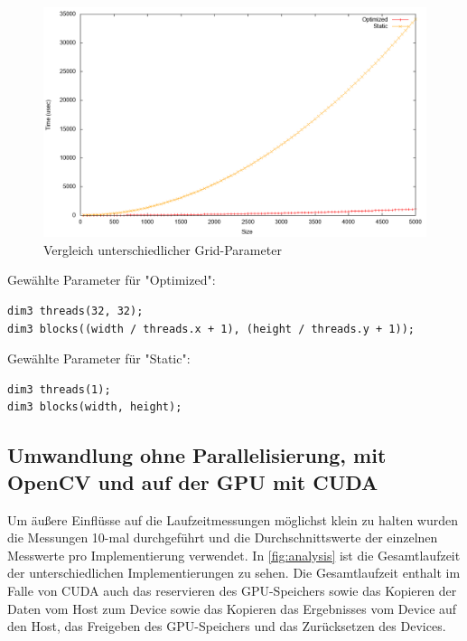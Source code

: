 \documentclass{llncs}
\begin{document}
\begin{figure}
	\centering
	\includegraphics[width=\textwidth,height=\textheight,keepaspectratio]{analysis_grids.png}
	\caption{Vergleich unterschiedlicher Grid-Parameter}
	\label{fig:analysis_grids}
\end{figure}

Gewählte Parameter für "Optimized":
\begin{lstlisting}
dim3 threads(32, 32);
dim3 blocks((width / threads.x + 1), (height / threads.y + 1));
\end{lstlisting}

Gewählte Parameter für "Static":
\begin{lstlisting}
dim3 threads(1);
dim3 blocks(width, height);
\end{lstlisting}

%
\subsection{Umwandlung ohne Parallelisierung, mit OpenCV und auf der GPU mit CUDA}
%

Um äußere Einflüsse auf die Laufzeitmessungen möglichst klein zu halten wurden die Messungen 10-mal durchgeführt und die Durchschnittswerte der einzelnen Messwerte pro Implementierung verwendet.
In \ref{fig:analysis} ist die Gesamtlaufzeit der unterschiedlichen Implementierungen zu sehen. Die Gesamtlaufzeit enthalt im Falle von CUDA auch das reservieren des GPU-Speichers sowie das Kopieren der Daten vom Host zum Device sowie das Kopieren das Ergebnisses vom Device auf den Host, das Freigeben des GPU-Speichers und das Zurücksetzen des Devices.
\end{document}
